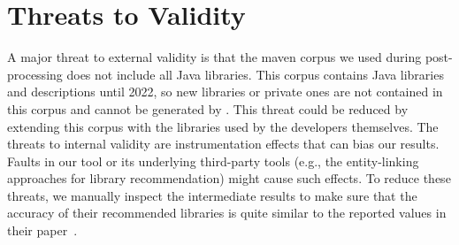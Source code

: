 \section{Threats to Validity} \label{sec:threats}

A major threat to external validity is that the maven corpus we used during post-processing does not include all Java libraries.
This corpus contains Java libraries and descriptions until 2022, so new libraries or private ones are not contained in this corpus and cannot be generated by \detector{}.
This threat could be reduced by extending this corpus with the libraries used by the developers themselves.
The threats to internal validity are instrumentation effects that can bias our results. Faults in our tool or its underlying third-party tools (e.g., the entity-linking approaches for library recommendation) might cause such effects. 
To reduce these threats, we manually inspect the intermediate results to make sure that the accuracy of their recommended libraries is quite similar to the reported values in their paper~\cite{vullib}.

